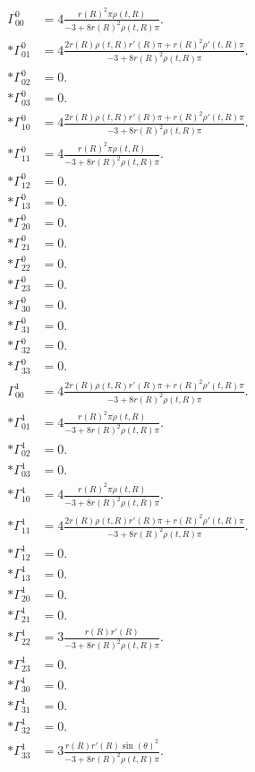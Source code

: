 \documentclass[fleqn,portrait]{article}
\begin{document}
\framebox{$\Gamma^{\sigma}_{\mu \nu}$}
\begin{align*}
\Gamma^0_{00} & = 4 \frac{ r(R)^{2} \pi \dot{\rho}(t,R)}{-3+8  r(R)^{2} \rho(t,R) \pi}. \\*
\Gamma^0_{01} & = 4 \frac{2  r(R) \rho(t,R) r'(R) \pi+ r(R)^{2} \rho'(t,R) \pi}{-3+8  r(R)^{2} \rho(t,R) \pi}. \\*
\Gamma^0_{02} & = 0. \\*
\Gamma^0_{03} & = 0. \\*
\Gamma^0_{10} & = 4 \frac{2  r(R) \rho(t,R) r'(R) \pi+ r(R)^{2} \rho'(t,R) \pi}{-3+8  r(R)^{2} \rho(t,R) \pi}. \\*
\Gamma^0_{11} & = 4 \frac{ r(R)^{2} \pi \dot{\rho}(t,R)}{-3+8  r(R)^{2} \rho(t,R) \pi}. \\*
\Gamma^0_{12} & = 0. \\*
\Gamma^0_{13} & = 0. \\*
\Gamma^0_{20} & = 0. \\*
\Gamma^0_{21} & = 0. \\*
\Gamma^0_{22} & = 0. \\*
\Gamma^0_{23} & = 0. \\*
\Gamma^0_{30} & = 0. \\*
\Gamma^0_{31} & = 0. \\*
\Gamma^0_{32} & = 0. \\*
\Gamma^0_{33} & = 0.
\end{align*}
\begin{align*}
\Gamma^1_{00} & = 4 \frac{2  r(R) \rho(t,R) r'(R) \pi+ r(R)^{2} \rho'(t,R) \pi}{-3+8  r(R)^{2} \rho(t,R) \pi}. \\*
\Gamma^1_{01} & = 4 \frac{ r(R)^{2} \pi \dot{\rho}(t,R)}{-3+8  r(R)^{2} \rho(t,R) \pi}. \\*
\Gamma^1_{02} & = 0. \\*
\Gamma^1_{03} & = 0. \\*
\Gamma^1_{10} & = 4 \frac{ r(R)^{2} \pi \dot{\rho}(t,R)}{-3+8  r(R)^{2} \rho(t,R) \pi}. \\*
\Gamma^1_{11} & = 4 \frac{2  r(R) \rho(t,R) r'(R) \pi+ r(R)^{2} \rho'(t,R) \pi}{-3+8  r(R)^{2} \rho(t,R) \pi}. \\*
\Gamma^1_{12} & = 0. \\*
\Gamma^1_{13} & = 0. \\*
\Gamma^1_{20} & = 0. \\*
\Gamma^1_{21} & = 0. \\*
\Gamma^1_{22} & = 3 \frac{ r(R) r'(R)}{-3+8  r(R)^{2} \rho(t,R) \pi}. \\*
\Gamma^1_{23} & = 0. \\*
\Gamma^1_{30} & = 0. \\*
\Gamma^1_{31} & = 0. \\*
\Gamma^1_{32} & = 0. \\*
\Gamma^1_{33} & = 3 \frac{ r(R) r'(R) \sin(\theta)^{2}}{-3+8  r(R)^{2} \rho(t,R) \pi}.
\end{align*}
\end{document}
